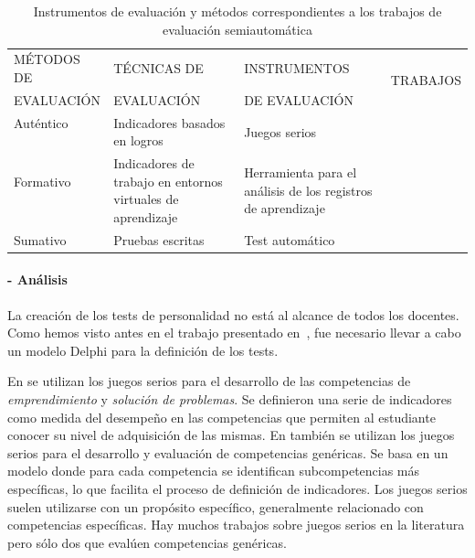 \begin{table}
  \begin{center}
  \setlength\tabcolsep{2.5pt}
  \begin{tabular}{| m{2.7cm} | m{4cm} | m{4cm} | m{2cm} |}
    \hline 
    MÉTODOS DE  & TÉCNICAS DE  & INSTRUMENTOS  & \multirow{2}{*}{TRABAJOS} \\
    EVALUACIÓN & EVALUACIÓN & DE EVALUACIÓN &  \\
    \hline
    \hline
    Auténtico  & \multirow{2}{4cm}{Indicadores basados en logros} & \multirow{2}{*}{Juegos serios} & \cite{bedek2011behavioral} \\
    \cline{1-1} \cline{4-4}
    \multirow{4}{*}{Formativo} &  &  & \cite{guenaga2013serious} \\
    \cline{2-4}
     & \multirow{3}{4cm}{Indicadores de trabajo en entornos virtuales de aprendizaje} & \multirow{3}{4cm}{Herramienta para el análisis de los registros de aprendizaje} & \multirow{3}{*}{\cite{fidalgo:2015,rayon2014web}} \\
     &  &  &  \\
     &  &  &  \\
    \hline
    Sumativo & Pruebas escritas & Test automático & \cite{andre2011formal} \\
    \hline
  \end{tabular}
\end{center}
\caption{Instrumentos de evaluación y métodos correspondientes a los trabajos de evaluación semiautomática}
\label{tab:MetodosAutomaticos}
\end{table} 


\paragraph*{- Análisis}
La creación de los  tests de personalidad no está al alcance de todos los docentes. Como hemos visto antes en el trabajo presentado en~\cite{andre2011formal}, fue necesario llevar a cabo un modelo Delphi para la definición de los tests.

En \cite{guenaga2013serious} se utilizan los juegos serios para el desarrollo de las competencias de \emph{emprendimiento} y \emph{solución de problemas}. Se definieron una serie de indicadores como medida del desempeño en las competencias que permiten al estudiante conocer su nivel de adquisición de las mismas. En \cite{bedek2011behavioral} también se utilizan los juegos serios para el desarrollo y evaluación de competencias genéricas. Se basa en un modelo donde para cada competencia se identifican subcompetencias más específicas, lo que facilita el proceso de definición de indicadores. Los juegos serios suelen utilizarse con un propósito específico, generalmente relacionado con competencias específicas. Hay muchos trabajos sobre juegos serios en la literatura pero sólo dos que evalúen competencias genéricas. 

